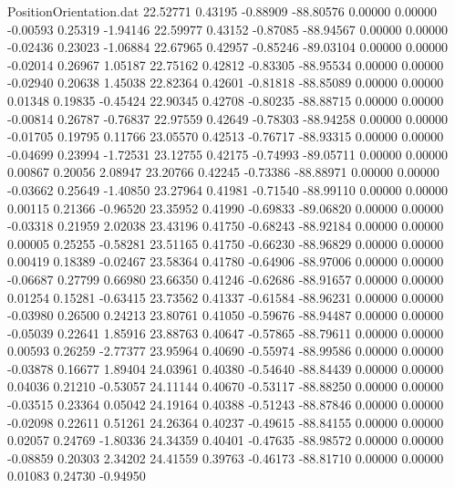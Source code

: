 \begin{filecontents}{PositionOrientation.dat}
  22.52771    0.43195   -0.88909   -88.80576    0.00000    0.00000   -0.00593    0.25319   -1.94146
  22.59977    0.43152   -0.87085   -88.94567    0.00000    0.00000   -0.02436    0.23023   -1.06884
  22.67965    0.42957   -0.85246   -89.03104    0.00000    0.00000   -0.02014    0.26967    1.05187
  22.75162    0.42812   -0.83305   -88.95534    0.00000    0.00000   -0.02940    0.20638    1.45038
  22.82364    0.42601   -0.81818   -88.85089    0.00000    0.00000    0.01348    0.19835   -0.45424
  22.90345    0.42708   -0.80235   -88.88715    0.00000    0.00000   -0.00814    0.26787   -0.76837
  22.97559    0.42649   -0.78303   -88.94258    0.00000    0.00000   -0.01705    0.19795    0.11766
  23.05570    0.42513   -0.76717   -88.93315    0.00000    0.00000   -0.04699    0.23994   -1.72531
  23.12755    0.42175   -0.74993   -89.05711    0.00000    0.00000    0.00867    0.20056    2.08947
  23.20766    0.42245   -0.73386   -88.88971    0.00000    0.00000   -0.03662    0.25649   -1.40850
  23.27964    0.41981   -0.71540   -88.99110    0.00000    0.00000    0.00115    0.21366   -0.96520
  23.35952    0.41990   -0.69833   -89.06820    0.00000    0.00000   -0.03318    0.21959    2.02038
  23.43196    0.41750   -0.68243   -88.92184    0.00000    0.00000    0.00005    0.25255   -0.58281
  23.51165    0.41750   -0.66230   -88.96829    0.00000    0.00000    0.00419    0.18389   -0.02467
  23.58364    0.41780   -0.64906   -88.97006    0.00000    0.00000   -0.06687    0.27799    0.66980
  23.66350    0.41246   -0.62686   -88.91657    0.00000    0.00000    0.01254    0.15281   -0.63415
  23.73562    0.41337   -0.61584   -88.96231    0.00000    0.00000   -0.03980    0.26500    0.24213
  23.80761    0.41050   -0.59676   -88.94487    0.00000    0.00000   -0.05039    0.22641    1.85916
  23.88763    0.40647   -0.57865   -88.79611    0.00000    0.00000    0.00593    0.26259   -2.77377
  23.95964    0.40690   -0.55974   -88.99586    0.00000    0.00000   -0.03878    0.16677    1.89404
  24.03961    0.40380   -0.54640   -88.84439    0.00000    0.00000    0.04036    0.21210   -0.53057
  24.11144    0.40670   -0.53117   -88.88250    0.00000    0.00000   -0.03515    0.23364    0.05042
  24.19164    0.40388   -0.51243   -88.87846    0.00000    0.00000   -0.02098    0.22611    0.51261
  24.26364    0.40237   -0.49615   -88.84155    0.00000    0.00000    0.02057    0.24769   -1.80336
  24.34359    0.40401   -0.47635   -88.98572    0.00000    0.00000   -0.08859    0.20303    2.34202
  24.41559    0.39763   -0.46173   -88.81710    0.00000    0.00000    0.01083    0.24730   -0.94950

\end{filecontents}
